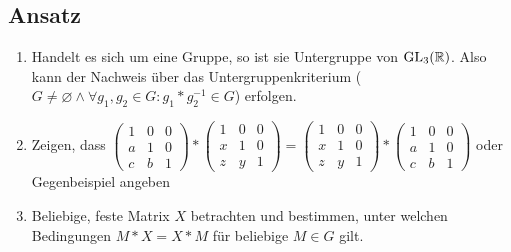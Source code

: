 \subsection{Ansatz}
\begin{enumerate}
	\item Handelt es sich um eine Gruppe, so ist sie Untergruppe von \( \text{GL}_3(\mathbb{R}) \). Also kann der Nachweis über das Untergruppenkriterium (\( G \neq \varnothing \wedge \forall g_1, g_2 \in G: g_1 * g_2^{-1} \in G \)) erfolgen.
	\item Zeigen, dass \( \begin{pmatrix}
		1 & 0 & 0 \\
		a & 1 & 0 \\
		c & b & 1
	\end{pmatrix} * \begin{pmatrix}
		1 & 0 & 0 \\
		x & 1 & 0 \\
		z & y & 1 
	\end{pmatrix}  = \begin{pmatrix}
		1 & 0 & 0 \\
		x & 1 & 0 \\
		z & y & 1 
	\end{pmatrix} * \begin{pmatrix}
		1 & 0 & 0 \\
		a & 1 & 0 \\
		c & b & 1
	\end{pmatrix} \) oder Gegenbeispiel angeben
	\item Beliebige, feste Matrix \( X \) betrachten und bestimmen, unter welchen Bedingungen \( M * X = X * M \) für beliebige \( M \in G \) gilt.
\end{enumerate}

